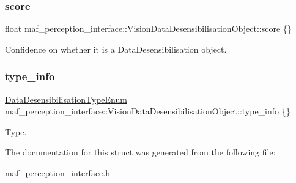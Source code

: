 \subsubsection{\texorpdfstring{score}{score}}
{\footnotesize\ttfamily float maf\+\_\+perception\+\_\+interface\+::\+Vision\+Data\+Desensibilisation\+Object\+::score \{\}}



Confidence on whether it is a Data\+Desensibilisation object. 

\mbox{\label{structmaf__perception__interface_1_1VisionDataDesensibilisationObject_a91989b2a32261e5d9adb51faa273a252}} 
\subsubsection{\texorpdfstring{type\+\_\+info}{type\_info}}
{\footnotesize\ttfamily \hyperlink{structmaf__perception__interface_1_1DataDesensibilisationTypeEnum}{Data\+Desensibilisation\+Type\+Enum} maf\+\_\+perception\+\_\+interface\+::\+Vision\+Data\+Desensibilisation\+Object\+::type\+\_\+info \{\}}



Type. 



The documentation for this struct was generated from the following file\+:\begin{DoxyCompactItemize}
\item 
\hyperlink{maf__perception__interface_8h}{maf\+\_\+perception\+\_\+interface.\+h}\end{DoxyCompactItemize}
